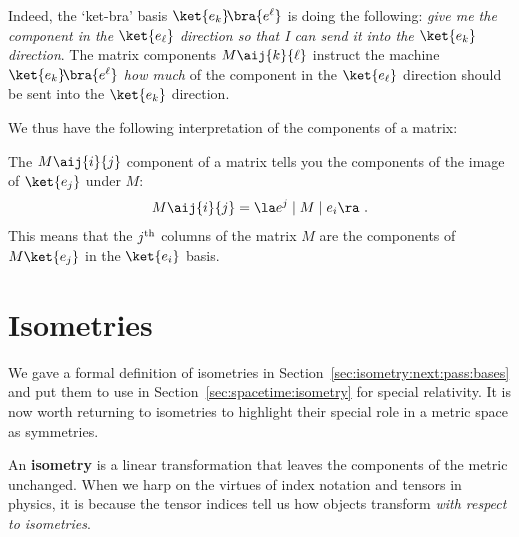 Indeed, the `ket-bra' basis $\ket{e_k}\!\bra{e^\ell}$ is doing the following: \emph{give me the component in the $\ket{e_\ell}$ direction so that I can send it into the $\ket{e_k}$ direction}. The matrix components $M\aij{k}{\ell}$ instruct the machine $\ket{e_k}\!\bra{e^\ell}$ \emph{how much} of the component in the $\ket{e_\ell}$ direction should be sent into the $\ket{e_k}$ direction.

We thus have the following interpretation of the components of a matrix:
\begin{bigidea}
The $M\aij{i}{j}$ component of a matrix tells you the components of the image of $\ket{e_j}$ under $M$:
\begin{align}
    M\aij{i}{j} = \la e^j \mid M \mid e_i \ra \ .
\end{align}
This means that the $j^\textnormal{th}$ columns of the matrix $M$ are the components of $M\ket{e_j}$ in the $\ket{e_i}$ basis.
\end{bigidea}




\section{Isometries}
\label{sec:isometries}

We gave a formal definition of isometries in Section~\ref{sec:isometry:next:pass:bases} and put them to use in Section~\ref{sec:spacetime:isometry} for special relativity. It is now worth returning to isometries to highlight their special role in a metric space as symmetries.

An \textbf{isometry} is a linear transformation that leaves the components of the metric unchanged. When we harp on the virtues of index notation and tensors in physics, it is because the tensor indices tell us how objects transform \emph{with respect to isometries}. 

